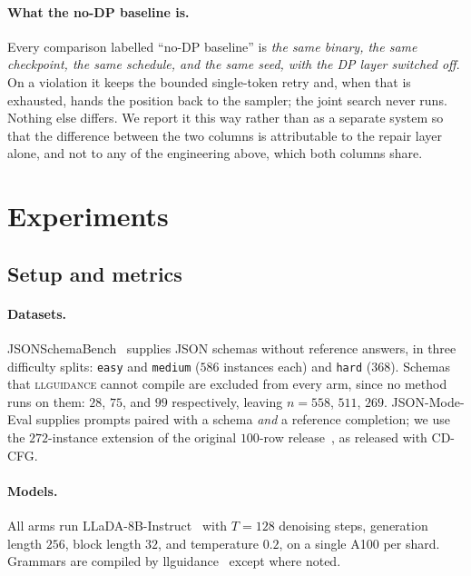 \documentclass{article}
\begin{document}
\paragraph{What the no-DP baseline is.}
Every comparison labelled ``no-DP baseline'' is \emph{the same binary, the same
checkpoint, the same schedule, and the same seed, with the DP layer switched
off}. On a violation it keeps the bounded single-token retry and, when that is
exhausted, hands the position back to the sampler; the joint search never runs.
Nothing else differs. We report it this way rather than as a separate system so
that the difference between the two columns is attributable to the repair layer
alone, and not to any of the engineering above, which both columns share.

\section{Experiments}
\label{sec:metric}

\subsection{Setup and metrics}

\paragraph{Datasets.}
JSONSchemaBench~\citep{geng2025jsonschemabenchrigorousbenchmarkstructured}
supplies JSON schemas without reference answers, in three difficulty splits:
\texttt{easy} and \texttt{medium} ($586$ instances each) and \texttt{hard}
($368$). Schemas that \textsc{llguidance} cannot compile are excluded from every
arm, since no method runs on them: $28$, $75$, and $99$ respectively, leaving
$n=558$, $511$, $269$. JSON-Mode-Eval supplies prompts paired with a schema \emph{and} a reference
completion; we use the $272$-instance extension
\citep{ethsri2025jsonmodeevalextended} of the original $100$-row
release~\citep{nousresearch2024jsonmodeeval}, as released with CD-CFG.

\paragraph{Models.}
All arms run LLaDA-8B-Instruct~\citep{llada} with $T{=}128$ denoising steps,
generation length $256$, block length $32$, and temperature $0.2$, on a single
A100 per shard. Grammars are compiled by
llguidance~\citep{microsoft2025llguidance} except where noted.
\end{document}
